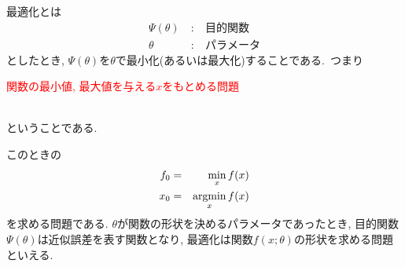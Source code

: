 最適化とは
\begin{eqnarray*}
  \Psi (\theta)\ &:&\ 目的関数\\
  \theta\ &:&\ パラメータ
\end{eqnarray*}
としたとき, $\Psi(\theta)$を$\theta$で最小化(あるいは最大化)することである.\ つまり\\
\centerline{\textcolor{red}{\large 関数の最小値, 最大値を与える$x$をもとめる問題}}\\
ということである.
\begin{center}
\end{center}
  このときの
\begin{eqnarray*}
    f_{0}&=&\underset{x}{\rm min}\,f(x)\\
    x_{0}&=&\underset{x}{\rm argmin}\,f(x)
\end{eqnarray*}
を求める問題である.
$\theta$が関数の形状を決めるパラメータであったとき, 目的関数$\Psi(\theta)$は近似誤差を表す関数となり, 最適化は関数$f(x;\theta)$の形状を求める問題といえる.

